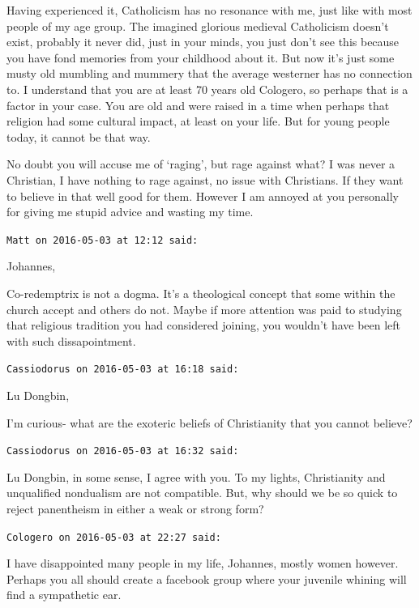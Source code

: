 \begin{footnotesize}
\begin{sffamily}
Having experienced it, Catholicism has no resonance with me, just like with most people of my age group. The imagined glorious medieval Catholicism doesn't exist, probably it never did, just in your minds, you just don't see this because you have fond memories from your childhood about it. But now it's just some musty old mumbling and mummery that the average westerner has no connection to. I understand that you are at least 70 years old Cologero, so perhaps that is a factor in your case. You are old and were raised in a time when perhaps that religion had some cultural impact, at least on your life. But for young people today, it cannot be that way.

No doubt you will accuse me of `raging', but rage against what? I was never a Christian, I have nothing to rage against, no issue with Christians. If they want to believe in that well good for them. However I am annoyed at you personally for giving me stupid advice and wasting my time.

\hfill

\texttt{Matt on 2016-05-03 at 12:12 said:}

Johannes,

Co-redemptrix is not a dogma. It's a theological concept that some within the church accept and others do not. Maybe if more attention was paid to studying that religious tradition you had considered joining, you wouldn't have been left with such dissapointment.

\hfill

\texttt{Cassiodorus on 2016-05-03 at 16:18 said:}

Lu Dongbin,

I'm curious- what are the exoteric beliefs of Christianity that you cannot believe?

\hfill

\texttt{Cassiodorus on 2016-05-03 at 16:32 said:}

Lu Dongbin, in some sense, I agree with you. To my lights, Christianity and unqualified nondualism are not compatible. But, why should we be so quick to reject panentheism in either a weak or strong form?

\hfill

\texttt{Cologero on 2016-05-03 at 22:27 said:}

I have disappointed many people in my life, Johannes, mostly women however. Perhaps you all should create a facebook group where your juvenile whining will find a sympathetic ear.


\end{sffamily}
\end{footnotesize}
